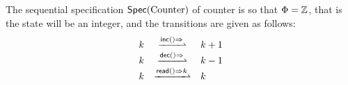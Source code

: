 \begin{example}
\label{definition:sequential specification of counter}
The sequential specification $\mathsf{Spec}(\text{Counter})$ of counter is so
that $\Phi = \mathbb{Z}$, that is the state will be an integer,
and the transitions are given as follows:
\[
  \begin{array}[rcl]{rcl}
    k & \xrightharpoonup{\alabellong[\mathsf{inc}]{}{}} & k+1\\
    k & \xrightharpoonup{\alabellong[\mathsf{dec}]{}{}} & k-1\\
    k & \xrightharpoonup{\alabellong[\mathsf{read}]{}{k}} & k
  \end{array}
\]
\end{example}


